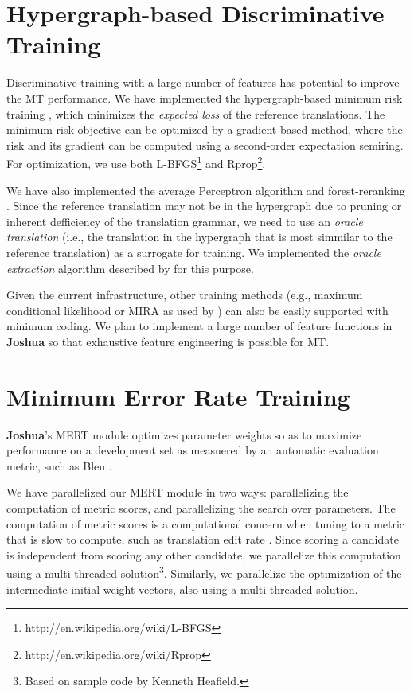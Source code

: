 \documentclass[11pt]{article}
\newcommand{\joshua}{\textbf{Joshua}\xspace}
\begin{document}
\section{Hypergraph-based Discriminative Training}

Discriminative training with a large number of features has 
potential to improve the MT performance.
We have implemented the hypergraph-based minimum risk training \cite{li-eisner:2009:EMNLP},
which minimizes the {\em expected loss} of the reference translations.
The minimum-risk objective can be optimized by a gradient-based method, where
the risk and its gradient can be computed using a second-order expectation semiring.
For optimization, we use both L-BFGS\footnote{http://en.wikipedia.org/wiki/L-BFGS} 
and Rprop\footnote{http://en.wikipedia.org/wiki/Rprop}.

We have also implemented the average Perceptron algorithm and forest-reranking \cite{zhifei-forest-reranking-galebook}.
Since the reference translation may not be in the hypergraph due to pruning or inherent
defficiency of the translation grammar, we need to use an {\em oracle translation} (i.e., the translation in
the hypergraph that is most simmilar to the reference translation) as a surrogate for training.
We implemented the {\em oracle extraction} algorithm described by 
for this purpose.

Given the current infrastructure, other training methods 
(e.g., maximum conditional likelihood or MIRA as used by )
can also be easily supported with minimum coding.
We plan to implement a large number of feature functions in \joshua so that exhaustive 
feature engineering is possible for MT.

\section{Minimum Error Rate Training}

\joshua's MERT module optimizes parameter weights so as to maximize performance
on a development set as measuered by an automatic evaluation metric, such as
Bleu \cite{och-mert}.

We have parallelized our MERT module in two ways: parallelizing the computation
of metric scores, and parallelizing the search over parameters. The computation
of metric scores is a computational concern when tuning to a metric that is
slow to compute, such as translation edit rate \cite{snover-etal:2006:ter}.
Since scoring a candidate is independent from scoring any other candidate, we
parallelize this computation using a multi-threaded solution\footnote{Based on
sample code by Kenneth Heafield.}. Similarly, we parallelize the optimization
of the intermediate initial weight vectors, also using a multi-threaded
solution.
\end{document}
